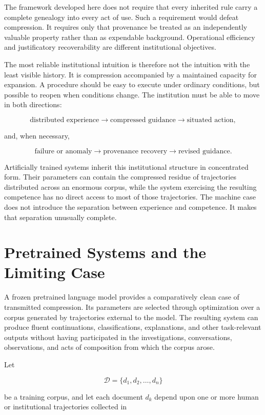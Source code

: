 \documentclass[11pt]{article}
\begin{document}
The framework developed here does not require that every inherited rule carry a complete genealogy into every act of use. Such a requirement would defeat compression. It requires only that provenance be treated as an independently valuable property rather than as expendable background. Operational efficiency and justificatory recoverability are different institutional objectives.

The most reliable institutional intuition is therefore not the intuition with the least visible history. It is compression accompanied by a maintained capacity for expansion. A procedure should be easy to execute under ordinary conditions, but possible to reopen when conditions change. The institution must be able to move in both directions:

\[
\text{distributed experience}
\longrightarrow
\text{compressed guidance}
\longrightarrow
\text{situated action},
\]

and, when necessary,

\[
\text{failure or anomaly}
\longrightarrow
\text{provenance recovery}
\longrightarrow
\text{revised guidance}.
\]

Artificially trained systems inherit this institutional structure in concentrated form. Their parameters can contain the compressed residue of trajectories distributed across an enormous corpus, while the system exercising the resulting competence has no direct access to most of those trajectories. The machine case does not introduce the separation between experience and competence. It makes that separation unusually complete.

\section{Pretrained Systems and the Limiting Case}

A frozen pretrained language model provides a comparatively clean case of transmitted compression. Its parameters are selected through optimization over a corpus generated by trajectories external to the model. The resulting system can produce fluent continuations, classifications, explanations, and other task-relevant outputs without having participated in the investigations, conversations, observations, and acts of composition from which the corpus arose.

Let

\[
\mathcal{D}
=
\{d_1,d_2,\ldots,d_n\}
\]

be a training corpus, and let each document $d_k$ depend upon one or more human or institutional trajectories collected in
\end{document}
